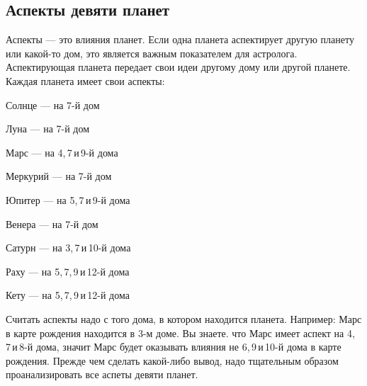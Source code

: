 \subsection{Аспекты девяти планет}

Аспекты --- это влияния планет. Если одна планета аспектирует другую планету или какой-то дом, это является важным показателем для астролога. Аспектирующая планета передает свои идеи другому дому или другой планете. Каждая планета имеет свои аспекты:
\begin{mylist}
	\item Солнце --- на 7-й дом
	\item Луна --- на 7-й дом
	\item Марс --- на 4,\,7\,и\,9-й дома
	\item Меркурий --- на 7-й дом
	\item Юпитер --- на 5,\,7\,и\,9-й дома
	\item Венера --- на 7-й дом	
	\item Сатурн --- на 3,\,7\,и\,10-й дома
	\item Раху --- на 5,\,7,\,9\,и\,12-й дома
	\item Кету --- на 5,\,7,\,9\,и\,12-й дома
\end{mylist}

Считать аспекты надо с того дома, в котором находится планета. Например: Марс в карте рождения находится в 3-м доме. Вы знаете. что Марс имеет аспект на 4,\,7\,и\,8-й дома, значит Марс будет оказывать влияния не 6,\,9\,и\,10-й дома в карте рождения. Прежде чем сделать какой-либо вывод, надо тщательным образом проанализировать все аспеты девяти планет.

